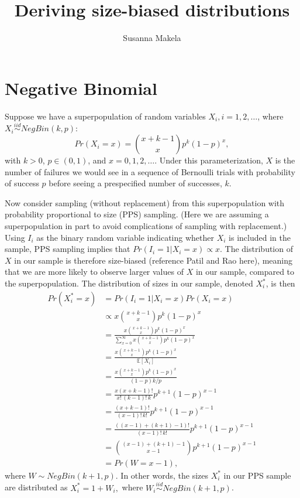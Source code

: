 \documentclass[10pt,a4paper]{article}
\author{Susanna Makela}
\title{Deriving size-biased distributions}
\begin{document}
\maketitle

\section*{Negative Binomial}
Suppose we have a superpopulation of random variables $X_i, i = 1, 2, \ldots$, where $X_i \overset{iid}{\sim} NegBin(k, p)$:
\[
	Pr(X_i = x) = \binom{x + k - 1}{x} p^k (1-p)^x,
\]
with $k > 0$, $p \in (0, 1)$, and $x = 0, 1, 2, \ldots$. Under this parameterization, $X$ is the number of failures we would see in a sequence of Bernoulli trials with probability of success $p$ before seeing a prespecified number of successes, $k$.

Now consider sampling (without replacement) from this superpopulation with probability proportional to size (PPS) sampling. (Here we are assuming a superpopulation in part to avoid complications of sampling with replacement.) Using $I_i$ as the binary random variable indicating whether $X_i$ is included in the sample, PPS sampling implies that $Pr(I_i = 1 | X_i = x) \propto x$. The distribution of $X$ in our sample is therefore size-biased (reference Patil and Rao here), meaning that we are more likely to observe larger values of $X$ in our sample, compared to the superpopulation. The distribution of sizes in our sample, denoted $X^*_i$, is then
\begin{align*}
	Pr(X^*_i = x) &= Pr(I_i = 1 | X_i = x) Pr(X_i = x) \\[5pt]
	&\propto x \binom{x + k - 1}{x} p^k (1-p)^x \\[5pt]
	&= \frac{x \binom{x + k - 1}{x} p^k (1-p)^x}{\sum_{x=0}^\infty x \binom{x + k - 1}{x} p^k (1-p)^x} \\[5pt]
	&= \frac{x \binom{x + k - 1}{x} p^k (1-p)^x}{\mathbb{E}[X_i]} \\[5pt]
	&= \frac{x \binom{x + k - 1}{x} p^k (1-p)^x}{(1-p)k/p} \\[5pt]
	&= \frac{x(x+k-1)!}{x! \, (k-1)! \, k} p^{k+1} (1-p)^{x-1} \\[5pt]
	&= \frac{(x+k-1)!}{(x-1)! \, k!} p^{k+1} (1-p)^{x-1} \\[5pt]
	&= \frac{((x-1)+(k+1)-1)!}{(x-1)! \, k!} p^{k+1} (1-p)^{x-1} \\[5pt]
	&= \binom{(x-1)+(k+1)-1}{x-1} p^{k+1} (1-p)^{x-1}	\\[5pt]
	&= Pr(W=x-1),
\end{align*}
where $W \sim NegBin(k+1, p)$. In other words, the sizes $X^*_i$ in our PPS sample are distributed as $X^*_i = 1 + W_i,$ where $W_i \overset{iid}{\sim} NegBin(k+1, p)$.
	
\end{document}
